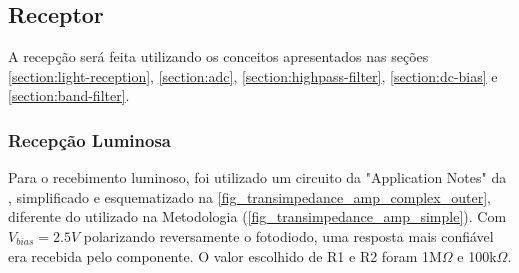 	\subsection{Receptor}
	
	A recepção será feita utilizando os conceitos apresentados nas seções \ref{section:light-reception}, \ref{section:adc},  \ref{section:highpass-filter}, \ref{section:dc-bias} e \ref{section:band-filter}.
	
	\subsubsection{Recepção Luminosa}
	Para o recebimento luminoso, foi utilizado um circuito da "Application Notes" da \cite{datasheet-opa380}, simplificado e esquematizado na \autoref{fig_transimpedance_amp_complex_outer}, diferente do utilizado na Metodologia (\autoref{fig_transimpedance_amp_simple}). Com $V_{bias} = 2.5V$ polarizando reversamente o fotodiodo, uma resposta mais confiável era recebida pelo componente. O valor escolhido de R1 e R2 foram  1M$\Omega$ e 100k$\Omega$.
	
